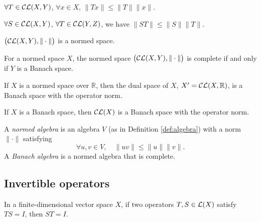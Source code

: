 \begin{lem}
  \label{lem:TxNormLE-Tnorm-xnorm}
  $\forall T\in {\cal CL}(X,Y)$, $\forall x\in X$,
  $\|Tx\|\le \|T\|\|x\|$.
\end{lem}

\begin{lem}
  \label{lem:STNormLE-SnormTnorm}
  $\forall S\in {\cal CL}(X,Y)$,
  $\forall T\in {\cal CL}(Y,Z)$, 
  we have $\|ST\|\le \|S\|\|T\|$.
\end{lem}

\begin{thm}
  \label{thm:OpNormCLXY}
  $\bigl({\cal CL}(X,Y), \|\cdot\|\bigr)$ is a normed space.
\end{thm}

\begin{lem}
  \label{lem:YisBanachImpliesCLXYisBanach}
  For a normed space $X$,
  the normed space \mbox{$\bigl({\cal CL}(X,Y), \|\cdot\|\bigr)$} is complete
  if and only if $Y$ is a Banach space.
\end{lem}

\begin{coro}
  If $X$ is a normed space over $\mathbb{R}$,
  then the dual space of $X$, $X'={\cal CL}(X,\mathbb{R})$,
  is a Banach space with the operator norm.
\end{coro}

\begin{coro}
  \label{coro:XisBanachSoIsCLX}
  If $X$ is a Banach space,
  then ${\cal CL}(X)$ is a Banach space with the operator norm.
\end{coro}

\begin{defn}
  A \emph{normed algebra} is an algebra $V$ (as in Definition \ref{def:algebra})
  with a norm $\|\cdot\|$ satisfying
  \begin{equation}
    \label{eq:normedAlgebra}
    \forall u,v \in V,\quad \|uv\|\le \|u\|\|v\|.
  \end{equation}
  A \emph{Banach algebra} is a normed algebra that is complete.
\end{defn}

\subsection{Invertible operators}
\label{sec:invertible-operators}

\begin{lem}
  In a finite-dimensional vector space $X$, 
  if two operators $T,S\in {\cal L}(X)$ satisfy
  $TS = I$, then $ST = I$.
\end{lem}

